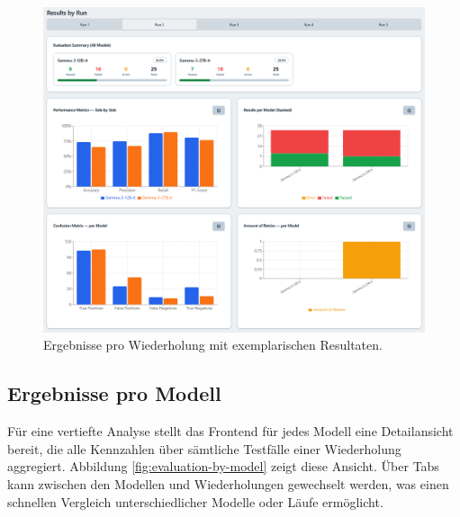 \begin{figure}[h]
    \centering
    \includegraphics[width=\textwidth]{images/evaluation/evaluation-result-by-run_new}
    \caption{Ergebnisse pro Wiederholung mit exemplarischen Resultaten.}
    \label{fig:evaluation-by-run}
\end{figure}

\subsection*{Ergebnisse pro Modell}

Für eine vertiefte Analyse stellt das Frontend für jedes Modell eine Detailansicht bereit, die alle Kennzahlen über sämtliche Testfälle einer Wiederholung aggregiert. Abbildung \ref{fig:evaluation-by-model} zeigt diese Ansicht. Über Tabs kann zwischen den Modellen und Wiederholungen gewechselt werden, was einen schnellen Vergleich unterschiedlicher Modelle oder Läufe ermöglicht.

